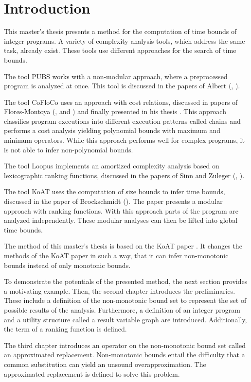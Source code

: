 \section{Introduction}

This master's thesis presents a method for the computation of time bounds of integer programs.
A variety of complexity analysis tools, which address the same task, already exist.
These tools use different approaches for the search of time bounds.

The tool PUBS works with a non-modular approach, where a preprocessed program is analyzed at once.
This tool is discussed in the papers of Albert (\cite{pubs1}, \cite{pubs2}).

The tool CoFloCo uses an approach with cost relations, discussed in papers of Flores-Montoya (\cite{cofloco1}, \cite{cofloco2} and \cite{cofloco4}) and finally presented in his thesis \cite{cofloco3}.
This approach classifies program executions into different execution patterns called chains and performs a cost analysis yielding polynomial bounds with maximum and minimum operators. 
While this approach performs well for complex programs, it is not able to infer non-polynomial bounds.

The tool Loopus implements an amortized complexity analysis based on lexicographic ranking functions, discussed in the papers of Sinn and Zuleger (\cite{loopus1}, \cite{loopus2}).

The tool KoAT uses the computation of size bounds to infer time bounds, discussed in the paper of Brockschmidt (\cite{koat}).
The paper presents a modular approach with ranking functions.
With this approach parts of the program are analyzed independently.
These modular analyses can then be lifted into global time bounds.

The method of this master's thesis is based on the KoAT paper \cite{koat}.
It changes the methods of the KoAT paper \cite{koat} in such a way, that it can infer non-monotonic bounds instead of only monotonic bounds.

To demonstrate the potentials of the presented method, the next section provides a motivating example.
Then, the second chapter introduces the preliminaries.
These include a definition of the non-monotonic bound set to represent the set of possible results of the analysis.
Furthermore, a definition of an integer program and a utility structure called a result variable graph are introduced.
Additionally, the term of a ranking function is defined.

The third chapter introduces an operator on the non-monotonic bound set called an approximated replacement.
Non-monotonic bounds entail the difficulty that a common substitution can yield an unsound overapproximation.
The approximated replacement is defined to solve this problem.

